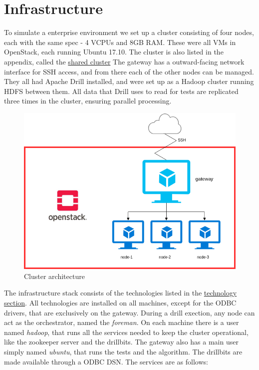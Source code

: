 \documentclass[a4paper,english]{report}
\begin{document}
		\section{Infrastructure}
			To simulate a enterprise environment we set up a cluster consisting of four nodes, each with the same spec - 4 VCPUs and 8GB RAM. These were all VMs in OpenStack, each running Ubuntu 17.10. The cluster is also listed in the appendix, called the \hyperref[table:cluster_shared]{shared cluster} The gateway has a outward-facing network interface for SSH access, and from there each of the other nodes can be managed. They all had Apache Drill installed, and were set up as a Hadoop cluster running HDFS between them. All data that Drill uses to read for tests are replicated three times in the cluster, ensuring parallel processing.
			\begin{figure}[h]
				\includegraphics[width=\textwidth]{cluster}
				\caption{Cluster architecture}
			\end{figure}
			The infrastructure stack consists of the technologies listed in the \hyperref[technology]{technology section}. All technologies are installed on all machines, except for the ODBC drivers, that are exclusively on the gateway. During a drill exection, any node can act as the orchestrator, named the \textit{foreman}. On each machine there is a user named \textit{hadoop}, that runs all the services needed to keep the cluster operational, like the zookeeper server and the drillbits. The gateway also has a main user simply named \textit{ubuntu}, that runs the tests and the algorithm. The drillbits are made available through a ODBC DSN.
			The services are as follows:
\end{document}
